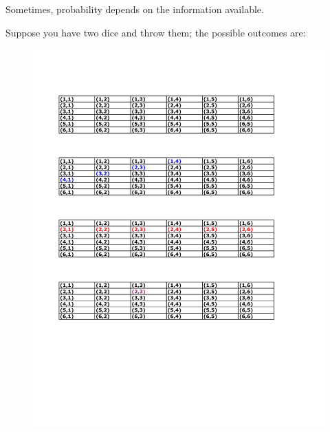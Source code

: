 \documentclass[notes=show,handout]{beamer}\usepackage[]{graphicx}\usepackage[]{color}
\begin{document}
\begin{frame}{\secname}
Sometimes, probability depends on the information available.
  \begin{example}
  Suppose you have two dice and throw them; the possible outcomes are:
  \begin{figure}[h!]
  \centering
  \includegraphics[scale=0.7]{img/c1.pdf}
  \end{figure}
  \end{example}
\end{frame}
\end{document}
